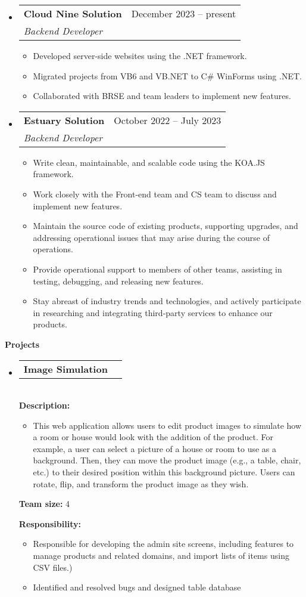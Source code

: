 \documentclass[letterpaper,12pt]{article}[leftmargin=*]
\makeatletter
\def \entryspacing {-0pt}
\renewcommand{\section}[2]{\vspace{5pt}
  \colorbox{secondary}{\color{white}\raggedbottom\normalsize\textbf{{#1}{\hspace{7pt}#2}}}
}
\newcommand{\resumeEntryStart}{\begin{itemize}[leftmargin=2.5mm]}
\newcommand{\resumeEntryEnd}{\end{itemize}\vspace{\entryspacing}}
\newcommand{\resumeItemListStart}{\begin{itemize}[leftmargin=4.5mm]}
\newcommand{\resumeItemListEnd}{\end{itemize}}
\newcommand{\resumeItem}[1]{
  \item\small{
    {#1 \vspace{-2pt}}
  }
}
\newcommand{\resumeEntryTSDL}[4]{
  \vspace{-1pt}\item[]
    \begin{tabularx}{0.97\textwidth}{X@{\hspace{60pt}}r}
      \textbf{\color{primary}#1} & {\firabook\color{accent}\small#2} \\
      \textit{\color{accent}\small#3} & \textit{\color{accent}\small#4} \\
    \end{tabularx}\vspace{-6pt}
}
\newcommand{\resumeEntryTD}[2]{
  \vspace{-1pt}\item[]
    \begin{tabularx}{0.97\textwidth}{X@{\hspace{60pt}}r}
      \textbf{\color{primary}#1} & {\firabook\color{accent}\small#2} \\
    \end{tabularx}\vspace{-6pt}
}
\makeatother
\begin{document}
  \resumeEntryStart
    \resumeEntryTSDL
      {Cloud Nine Solution}{December 2023 -- present}
      {Backend Developer}{}
    \resumeItemListStart
      \resumeItem {Developed server-side websites using the .NET framework.}
      \resumeItem{Migrated projects from VB6 and VB.NET to C# WinForms using .NET.}
      \resumeItem{Collaborated with BRSE and team leaders to implement new features.}
    \resumeItemListEnd
    \resumeEntryTSDL
      {Estuary Solution}{October 2022 -- July 2023}
      {Backend Developer}{}
    \resumeItemListStart
      \resumeItem {Write clean, maintainable, and scalable code using the KOA.JS framework.}
      \resumeItem {Work closely with the Front-end team and CS team to discuss and implement new features.}
      \resumeItem {Maintain the source code of existing products, supporting upgrades, and addressing operational issues that may arise during the course of operations.}
      \resumeItem{Provide operational support to members of other teams, assisting in testing, debugging, and releasing new features.}
      \resumeItem{Stay abreast of industry trends and technologies, and actively participate in researching and integrating third-party services to enhance our products.}
    \resumeItemListEnd
  \resumeEntryEnd

\section{\faFlask}{Projects}


  \resumeEntryStart
    \resumeEntryTD
      { Image Simulation}{}

        \textbf{\\Description: }
        
            \resumeItemListStart
              \resumeItem {This web application allows users to edit product images to simulate how a room or house would look with the addition of the product. For example, a user can select a picture of a house or room to use as a background. Then, they can move the product image (e.g., a table, chair, etc.) to their desired position within this background picture. Users can rotate, flip, and transform the product image as they wish.}
            \resumeItemListEnd


        \textbf{Team size: }4

        
        \textbf{Responsibility: }
            \resumeItemListStart
                \resumeItem{Responsible for developing the admin site screens, including features to manage products and related domains, and import lists of items using CSV files.)}
                \resumeItem{Identified and resolved bugs and designed table database}
            \resumeItemListEnd
  \resumeEntryEnd
  
\end{document}
